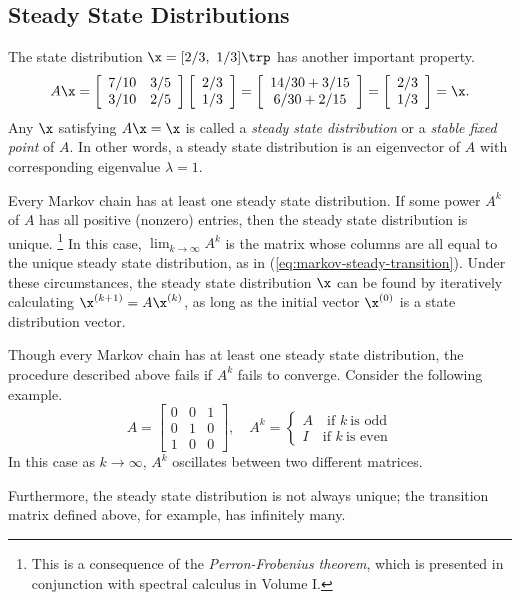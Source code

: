 \subsection*{Steady State Distributions} %

The state distribution $\x = [2/3,\ 1/3]\trp$ has another important property.
\[
A\x =
\left[\begin{array}{cc}
7/10 & 3/5 \\
3/10 & 2/5 \\
\end{array}\right]
\left[\begin{array}{c}2/3 \\ 1/3\end{array}\right]
=
\left[\begin{array}{c}14/30 + 3/15 \\ 6/30 + 2/15\end{array}\right]
=
\left[\begin{array}{c}2/3 \\ 1/3\end{array}\right]
= \x.
\]
Any $\x$ satisfying $A\x = \x$ is called a \emph{steady state distribution} or a \emph{stable fixed point} of $A$.
In other words, a steady state distribution is an eigenvector of $A$ with corresponding eigenvalue $\lambda = 1$.

Every Markov chain has at least one steady state distribution.
If some power $A^k$ of $A$ has all positive (nonzero) entries, then the steady state distribution is unique.%
\footnote{This is a consequence of the \emph{Perron-Frobenius theorem}, which is presented in conjunction with spectral calculus in Volume I.}
In this case, $\lim_{k\rightarrow\infty}A^k$ is the matrix whose columns are all equal to the unique steady state distribution, as in (\ref{eq:markov-steady-transition}).
Under these circumstances, the steady state distribution $\x$ can be found by iteratively calculating $\x^{(k+1)} = A\x^{(k)}$, as long as the initial vector $\x^{(0)}$ is a state distribution vector.

\begin{warn}
Though every Markov chain has at least one steady state distribution, the procedure described above fails if $A^k$ fails to converge.
Consider the following example.
\[
A = \left[\begin{array}{ccc}
0 & 0 & 1 \\
0 & 1 & 0 \\
1 & 0 & 0
\end{array}\right]
,\quad A^k = \begin{cases}
A\quad\text{if } k\ \text{is odd}
\\
I\quad\text{if } k\ \text{is even}
\end{cases}
\]
In this case as $k\rightarrow\infty$, $A^k$ oscillates between two different matrices.

Furthermore, the steady state distribution is not always unique; the transition matrix defined above, for example, has infinitely many.
\end{warn}

